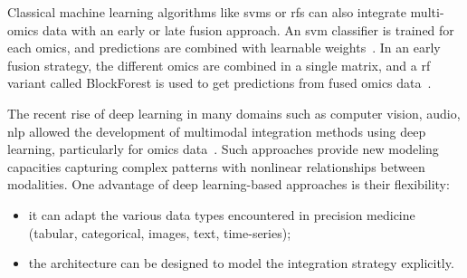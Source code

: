 \documentclass[../main.tex]{subfiles}
\begin{document}
	Classical machine learning algorithms like \glspl{svm} or \glspl{rf} can also integrate multi-omics data with an early or late fusion approach.
	An \gls{svm} classifier is trained for each omics, and predictions are combined with learnable weights~\cite{CarrilloPerez2022}.
	In an early fusion strategy, the different omics are combined in a single matrix, and a \gls{rf} variant called BlockForest is used to get predictions from fused omics data~\cite{Hornung2019}.

	The recent rise of deep learning in many domains such as computer vision, audio, \gls{nlp} allowed the development of multimodal integration methods using deep learning, particularly for omics data~\cite{Kang2021}.
	Such approaches provide new modeling capacities capturing complex patterns with nonlinear relationships between modalities.
	One advantage of deep learning-based approaches is their flexibility:
	\begin{itemize}[nosep]
		\item it can adapt the various data types encountered in precision medicine (tabular, categorical, images, text, time-series);
		\item the architecture can be designed to model the integration strategy explicitly.
	\end{itemize}

\end{document}
